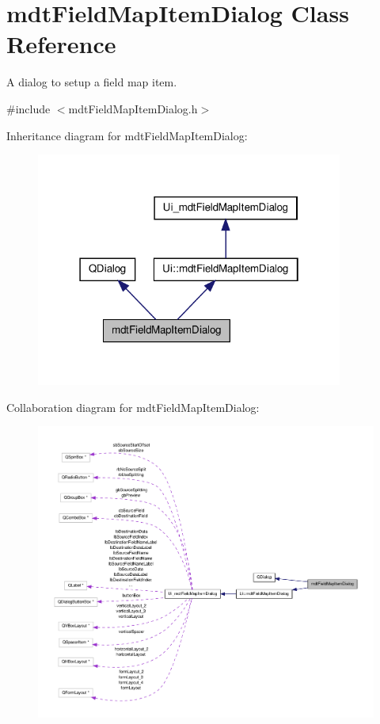 \hypertarget{classmdt_field_map_item_dialog}{\section{mdt\-Field\-Map\-Item\-Dialog Class Reference}
\label{classmdt_field_map_item_dialog}
}


A dialog to setup a field map item.  




{\ttfamily \#include $<$mdt\-Field\-Map\-Item\-Dialog.\-h$>$}



Inheritance diagram for mdt\-Field\-Map\-Item\-Dialog\-:
\nopagebreak
\begin{figure}[H]
\begin{center}
\leavevmode
\includegraphics[width=286pt]{classmdt_field_map_item_dialog__inherit__graph}
\end{center}
\end{figure}


Collaboration diagram for mdt\-Field\-Map\-Item\-Dialog\-:
\nopagebreak
\begin{figure}[H]
\begin{center}
\leavevmode
\includegraphics[width=350pt]{classmdt_field_map_item_dialog__coll__graph}
\end{center}
\end{figure}
